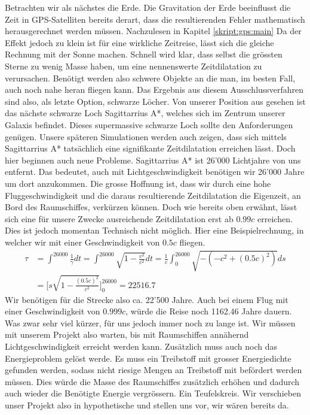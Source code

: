 \begin{refsection}
    Betrachten wir als nächstes die Erde. Die Gravitation der Erde beeinflusst die Zeit in GPS-Satelliten bereits derart, dass die resultierenden Fehler mathematisch herausgerechnet werden müssen. Nachzulesen in Kapitel \ref{skript:gps:main} %
    Da der Effekt jedoch zu klein ist für eine wirkliche Zeitreise, lässt sich die gleiche Rechnung mit der Sonne machen. Schnell wird klar, dass selbst die grössten Sterne zu wenig Masse haben, um eine nennenswerte Zeitdilatation zu verursachen. Benötigt werden also schwere Objekte an die man, im besten Fall, auch noch nahe heran fliegen kann. Das Ergebnis aus diesem Ausschlussverfahren sind also, als letzte Option, schwarze Löcher. Von unserer Position aus gesehen ist das nächste schwarze Loch Sagittarrius A*, welches sich im Zentrum unserer Galaxis befindet. Dieses supermassive schwarze Loch sollte den Anforderungen genügen. Unsere späteren Simulationen werden auch zeigen, dass sich mittels Sagittarrius A*  tatsächlich eine signifikante Zeitdilatation erreichen lässt.
    Doch hier beginnen auch neue Probleme. Sagittarrius A* ist 26'000 Lichtjahre von uns entfernt. Das bedeutet, auch mit Lichtgeschwindigkeit benötigen wir 26'000 Jahre um dort anzukommen. Die grosse Hoffnung ist, dass wir durch eine hohe Fluggeschwindigkeit und die daraus resultierende Zeitdilatation die Eigenzeit, an Bord des Raumschiffes, verkürzen können. 
    Doch wie bereits oben erwähnt, lässt sich eine für unsere Zwecke ausreichende Zeitdilatation erst ab $0.99c$ erreichen. Dies ist jedoch momentan Technisch nicht möglich. 
    Hier eine Beispielrechnung, in welcher wir mit einer Geschwindigkeit von $0.5c$ fliegen.
	\begin{align*}
	\tau
	&= 
	\int_{}^{26000}\frac{1}{\gamma}dt=\int_{}^{26000}\sqrt{1-\frac{v^2}{c^2}}dt
	= 
	\frac{1}{c}\int_{0}^{26000}\sqrt{-(-c^2+(0.5c)^2)}ds\\
	&=
	\biggl[s\sqrt{1-\frac{(0.5c)^{2}}{c^2}}\biggr]_0^{26000}
	=
	22516.7
	\end{align*}
	Wir benötigen für die Strecke also ca. 22'500 Jahre.
	Auch bei einem Flug mit einer Geschwindigkeit von $0.999c$, würde die Reise noch 1162.46 Jahre dauern. Was zwar sehr viel kürzer, für uns jedoch immer noch zu lange ist.
	Wir müssen mit unserem Projekt also warten, bis mit Raumschiffen annähernd Lichtgeschwindigkeit erreicht werden kann. Zusätzlich muss auch noch das Energieproblem gelöst werde. Es muss ein Treibstoff mit grosser Energiedichte gefunden werden, sodass nicht riesige Mengen an Treibstoff mit befördert werden müssen. Dies würde die Masse des Raumschiffes zusätzlich erhöhen und dadurch auch wieder die Benötigte Energie vergrössern. Ein Teufelskreis.
	Wir verschieben unser Projekt also in hypothetische und stellen uns vor, wir wären bereits da.
	

\end{refsection}
